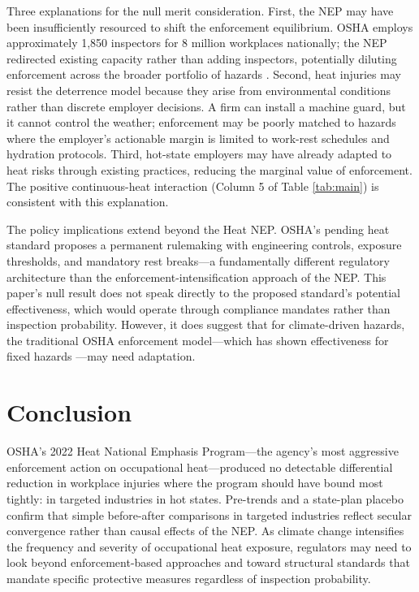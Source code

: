 \documentclass[12pt]{article}
\begin{document}
Three explanations for the null merit consideration. First, the NEP may have been insufficiently resourced to shift the enforcement equilibrium. OSHA employs approximately 1,850 inspectors for 8 million workplaces nationally; the NEP redirected existing capacity rather than adding inspectors, potentially diluting enforcement across the broader portfolio of hazards \citep{weil2008enforcing}. Second, heat injuries may resist the deterrence model because they arise from environmental conditions rather than discrete employer decisions. A firm can install a machine guard, but it cannot control the weather; enforcement may be poorly matched to hazards where the employer's actionable margin is limited to work-rest schedules and hydration protocols. Third, hot-state employers may have already adapted to heat risks through existing practices, reducing the marginal value of enforcement. The positive continuous-heat interaction (Column 5 of Table \ref{tab:main}) is consistent with this explanation.

The policy implications extend beyond the Heat NEP. OSHA's pending heat standard proposes a permanent rulemaking with engineering controls, exposure thresholds, and mandatory rest breaks---a fundamentally different regulatory architecture than the enforcement-intensification approach of the NEP. This paper's null result does not speak directly to the proposed standard's potential effectiveness, which would operate through compliance mandates rather than inspection probability. However, it does suggest that for climate-driven hazards, the traditional OSHA enforcement model---which has shown effectiveness for fixed hazards \citep{gray1993osha, ko2014osha}---may need adaptation.


\section{Conclusion}

OSHA's 2022 Heat National Emphasis Program---the agency's most aggressive enforcement action on occupational heat---produced no detectable differential reduction in workplace injuries where the program should have bound most tightly: in targeted industries in hot states. Pre-trends and a state-plan placebo confirm that simple before-after comparisons in targeted industries reflect secular convergence rather than causal effects of the NEP. As climate change intensifies the frequency and severity of occupational heat exposure, regulators may need to look beyond enforcement-based approaches and toward structural standards that mandate specific protective measures regardless of inspection probability.
\end{document}
